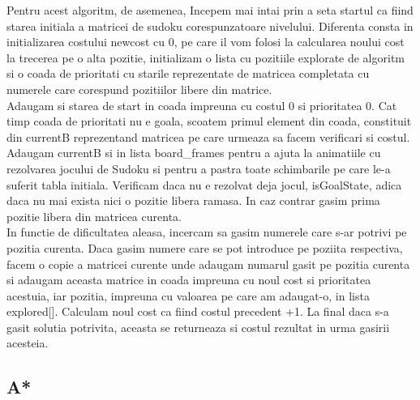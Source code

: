 \documentclass[a4paper,18pt]{article}
\begin{document}
\tab Pentru acest algoritm, de asemenea, Incepem mai intai prin a seta startul ca fiind starea initiala a matricei de sudoku corespunzatoare nivelului. Diferenta consta in initializarea costului newcost cu 0, pe care il vom folosi la calcularea noului cost la trecerea pe o alta pozitie, initializam o lista cu pozitiile explorate de algoritm si o coada de prioritati cu starile reprezentate de matricea completata cu numerele care corespund pozitiilor libere din matrice. 
\newline
\\ \indent Adaugam si starea de start in coada impreuna cu costul 0 si prioritatea 0. Cat timp coada de prioritati nu e goala, scoatem primul element din coada, constituit din currentB reprezentand matricea pe care urmeaza sa facem verificari si costul. Adaugam currentB si in lista board\_frames pentru a ajuta la animatiile cu rezolvarea jocului de Sudoku si pentru a pastra toate schimbarile pe care le-a suferit tabla initiala. Verificam daca nu e rezolvat deja jocul, isGoalState, adica daca nu mai exista nici o pozitie libera ramasa. In caz contrar gasim prima pozitie libera din matricea curenta. 
\newline
\\ \indent In functie de dificultatea aleasa, incercam sa gasim numerele care s-ar potrivi pe pozitia curenta. Daca gasim numere care se pot introduce pe poziita respectiva, facem o copie a matricei curente unde adaugam numarul gasit pe pozitia curenta si adaugam aceasta matrice in coada impreuna cu noul cost si prioritatea acestuia, iar pozitia, impreuna cu valoarea pe care am adaugat-o, in lista explored[]. Calculam noul cost ca fiind costul precedent +1. La final daca s-a gasit solutia potrivita, aceasta se returneaza si costul rezultat in urma gasirii acesteia.

\subsection{A* }
\end{document}
